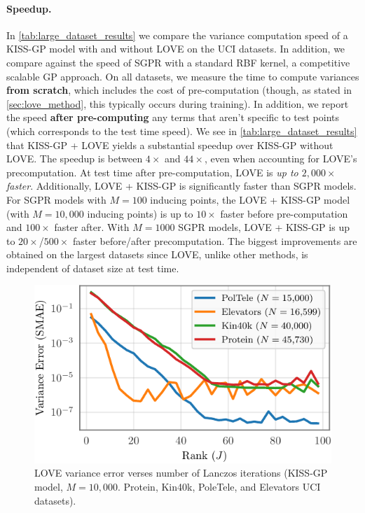 \paragraph{Speedup.}
In \cref{tab:large_dataset_results} we compare the variance computation speed of a KISS-GP model with and without LOVE{} on the UCI datasets.
In addition, we compare against the speed of SGPR with a standard RBF kernel, a competitive scalable GP approach.
On all datasets, we measure the time to compute variances {\bf from scratch}, which includes the cost of pre-computation (though, as stated in \cref{sec:love_method}, this typically occurs during training).
In addition, we report the speed {\bf after pre-computing} any terms that aren't specific to test points (which corresponds to the test time speed).
We see in \cref{tab:large_dataset_results} that KISS-GP + LOVE{} yields a substantial speedup over KISS-GP without LOVE{}.
The speedup is between $4\times$ and $44\times$, even when accounting for LOVE{}'s precomputation.
At test time after pre-computation, LOVE{} is \emph{up to $2,\!000\times$ faster}.
Additionally, LOVE + KISS-GP{} is significantly faster than SGPR models.
For SGPR models with $M=100$ inducing points, the LOVE + KISS-GP{} model (with $M=10,\!000$ inducing points) is up to $10\times$ faster before pre-computation and $100\times$ faster after.
With $M=1000$ SGPR models, LOVE + KISS-GP{} is up to $20\times$/$500\times$ faster before/after precomputation.
The biggest improvements are obtained on the largest datasets since LOVE{}, unlike other methods, is independent of dataset size at test time.

\begin{figure}[t!]
  \centering
  \includegraphics[width=0.70\columnwidth]{figures/lanczos_accuracy.pdf}
  \vspace{-2ex}
  \caption[LOVE variance error verses number of Lanczos iterations.]{
    LOVE variance error verses number of Lanczos iterations
    (KISS-GP model, $M=10,\!000$. Protein, Kin40k, PoleTele, and Elevators UCI datasets).
    \label{fig:lanczos_accuracy}
  }
  \vspace{-1ex}
\end{figure}

